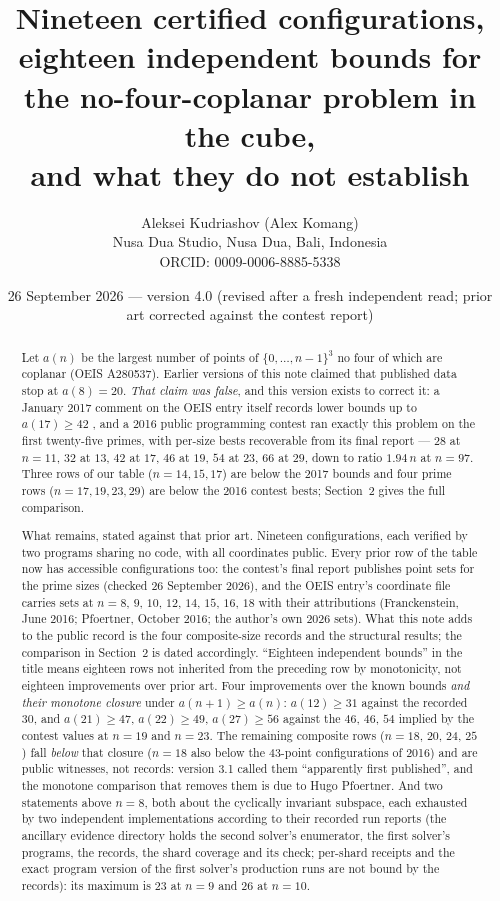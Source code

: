 \documentclass[11pt,a4paper]{article}
\title{Nineteen certified configurations, eighteen independent bounds for the no-four-coplanar problem in the cube,\\
and what they do not establish}
\author{Aleksei Kudriashov (Alex Komang)\\ \small Nusa Dua Studio, Nusa Dua, Bali, Indonesia\\ \small ORCID: 0009-0006-8885-5338}
\date{26 September 2026 --- version 4.0 (revised after a fresh independent read; prior art corrected against the contest report)}
\begin{document}
\maketitle
\begin{abstract}
Let $a(n)$ be the largest number of points of $\{0,\dots,n-1\}^3$ no four of which are coplanar
(OEIS A280537).  Earlier versions of this note claimed that published data stop at $a(8)=20$.
\emph{That claim was false}, and this version exists to correct it: a January 2017 comment on
the OEIS entry itself records lower bounds up to $a(17)\ge42$ \cite{OEISA280537}, and a 2016
public programming contest ran exactly this problem on the first twenty-five primes, with
per-size bests recoverable from its final report \cite{AZsPCs} --- $28$ at $n=11$, $32$ at $13$,
$42$ at $17$, $46$ at $19$, $54$ at $23$, $66$ at $29$, down to ratio $1.94\,n$ at $n=97$.
Three rows of our table ($n=14,15,17$) are below the 2017 bounds and four prime rows
($n=17,19,23,29$) are below the 2016 contest bests; Section~2 gives the full comparison.

What remains, stated against that prior art.  Nineteen configurations, each verified by two
programs sharing no code, with all coordinates public.  Every prior row of the table now has
accessible configurations too: the contest's final report publishes point sets for the prime sizes
(checked 26 September 2026), and the OEIS entry's coordinate file carries sets at $n=8$, $9$, $10$, $12$,
$14$, $15$, $16$, $18$ with their attributions (Franckenstein, June 2016; Pfoertner, October 2016; the
author's own 2026 sets).  What this note adds to the public record is the four composite-size records
and the structural results; the comparison in Section~2 is dated accordingly.  ``Eighteen independent bounds'' in the title means eighteen rows not inherited from
the preceding row by monotonicity, not eighteen improvements over prior art.  Four improvements over the known bounds \emph{and their monotone
closure} under $a(n+1)\ge a(n)$: $a(12)\ge31$ against the recorded $30$, and $a(21)\ge47$,
$a(22)\ge49$, $a(27)\ge56$ against the $46$, $46$, $54$ implied by the contest values at $n=19$
and $n=23$.  The remaining composite rows ($n=18$, $20$, $24$, $25$) fall \emph{below} that
closure ($n=18$ also below the $43$-point configurations of 2016) and are public witnesses, not records: version 3.1 called them ``apparently first
published'', and the monotone comparison that removes them is due to Hugo Pfoertner.  And two
statements above $n=8$, both about the cyclically invariant subspace, each exhausted by two
independent implementations according to their recorded run reports (the ancillary evidence
directory holds the second solver's enumerator, the first solver's programs, the records, the shard
coverage and its check; per-shard receipts and the exact program version of the first solver's
production runs are not bound by the records): its maximum is $23$ at $n=9$ and $26$ at $n=10$.


\end{abstract}
\end{document}
